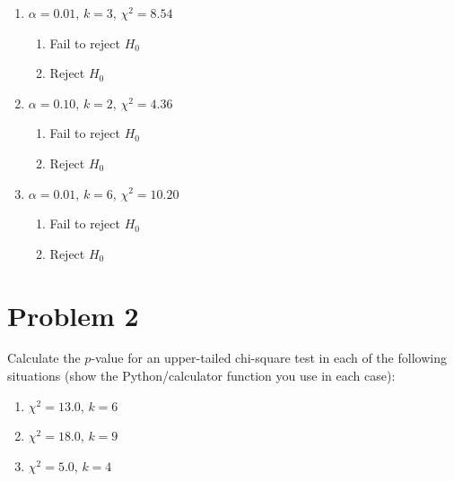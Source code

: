\documentclass[11pt,twoside]{article}
\newcommand{\pts}[1]{\marginpar{ \small\hspace{0pt} \textit{[#1]} } }
\numberwithin{equation}{section}
\newcommand{\?}{\stackrel{?}{=}}
\begin{document}
\begin{enumerate}[\bf (a)]
	\item $\alpha = 0.01$, $k = 3$, $\chi^2 = 8.54$ \pts{3}
	\vspace{20ex}
	\begin{enumerate}[\bf i.]
		\item Fail to reject $H_0$
		\item Reject $H_0$
	\end{enumerate}
	\item $\alpha = 0.10$, $k = 2$, $\chi^2 = 4.36$ \pts{3}
		\vspace{20ex}
	\begin{enumerate}[\bf i.]
		\item Fail to reject $H_0$
		\item Reject $H_0$
	\end{enumerate}
	\item $\alpha = 0.01$, $k = 6$, $\chi^2 = 10.20$ \pts{3}
		\vspace{20ex}
	\begin{enumerate}[\bf i.]
		\item Fail to reject $H_0$
		\item Reject $H_0$
	\end{enumerate}
\end{enumerate}


\section*{Problem 2      }
Calculate the $p$-value for an upper-tailed chi-square test in each of the following situations (show the Python/calculator function you use in each case):
\begin{enumerate}[\bf (a)]
	\item $\chi^2 = 13.0$, $k = 6$\pts{2}
	\vspace{30ex}
	\item  $\chi^2 = 18.0$, $k = 9$\pts{2}
	\vspace{30ex}
	\item $\chi^2 = 5.0$, $k =4$\pts{2}
	\vspace{30ex}
\end{enumerate}

\eject
\end{document}
